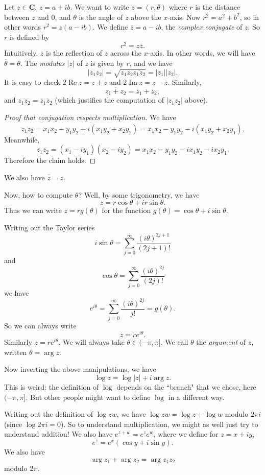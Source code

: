 \documentclass[12pt]{report}
\newcommand{\CC}{\mathbf{C}}
\newcommand{\dfn}[1]{\emph{#1}\index{#1}}
\renewcommand{\Re}{\operatorname{Re}}
\renewcommand{\Im}{\operatorname{Im}}
\theoremstyle{definition}
\theoremstyle{remark}
\begin{document}
Let $z \in \CC$, $z = a + ib$. We want to write $z = (r, \theta)$ where $r$ is the distance between $z$ and $0$, and $\theta$ is the angle of $z$ above the $x$-axis. Now $r^2 = a^2 + b^2$, so in other words $r^2 = z(a - ib)$. We define $\overline z = a - ib$, the \dfn{complex conjugate} of $z$. So $r$ is defined by
$$r^2 = z \overline z.$$
Intuitively, $\overline z$ is the reflection of $z$ across the $x$-axis. In other words, we will have $\overline \theta = \theta$. The \dfn{modulus} $|z|$ of $z$ is given by $r$, and we have
$$|z_1z_2| = \sqrt{z_1z_2 \overline{z_1z_2}} = |z_1| |z_2|.$$
It is easy to check $2 \Re z = z + \overline z$ and $2 \Im z = z - \overline z$. Similarly,
$$\overline{z_1 + z_2} = \overline z_1 + \overline z_2,$$
and $\overline{z_1z_2} = \overline z_1 \overline z_2$ (which justifies the computation of $|z_1z_2|$ above).
\begin{proof}[Proof that conjugation respects multiplication]
We have
$$\overline{z_1z_2} = \overline{x_1x_2 - y_1y_2 + i(x_1y_2 + x_2y_1)} = x_1x_2 - y_1y_2 - i(x_1y_2 + x_2y_1).$$
Meanwhile,
$$\overline{z_1}\overline{z_2} = (x_1 - iy_1)(x_2 - iy_2) = x_1x_2 - y_1y_2 - ix_1y_2 - ix_2y_1.$$
Therefore the claim holds.
\end{proof}
We also have $\overline{\overline z} = z$.

Now, how to compute $\theta$? Well, by some trigonometry, we have
$$z = r \cos \theta + ir \sin \theta.$$
Thus we can write $z = rg(\theta)$ for the function $g(\theta) = \cos \theta + i\sin \theta$.

Writing out the Taylor series
$$i \sin \theta = \sum_{j=0}^\infty \frac{(i\theta)^{2j+1}}{(2j+1)!}$$
and
$$\cos \theta = \sum_{j=0}^\infty \frac{(i\theta)^{2j}}{(2j)!}$$
we have
$$e^{i\theta} = \sum_{j=0}^\infty \frac{(i\theta)^{2j}}{j!} = g(\theta).$$
So we can always write
$$z = re^{i\theta}.$$
Similarly $\overline z = re^{i\theta}$. We will always take $\theta \in (-\pi, \pi]$. We call $\theta$ the \dfn{argument} of $z$, written $\theta = \arg z$.

Now inverting the above manipulations, we have
$$\log z = \log |z| + i \arg z.$$
This is weird: the definition of $\log$ depends on the ``branch" that we chose, here $(-\pi, \pi]$. But other people might want to define $\log$ in a different way.

Writing out the definition of $\log zw$, we have $\log zw = \log z + \log w$ modulo $2\pi i$ (since $\log 2\pi i =0$). So to understand multiplication, we might as well just try to understand addition! We also have $e^{z+w} = e^ze^w$, where we define for $z = x+iy$,
$$e^z = e^x(\cos y + i\sin y).$$
We also have
$$\arg z_1 + \arg z_2 = \arg z_1z_2$$
modulo $2\pi$.
\end{document}
